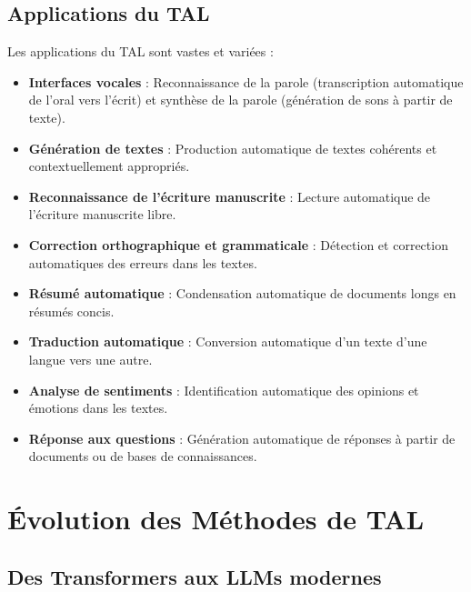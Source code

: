 \subsection{Applications du TAL}

Les applications du TAL sont vastes et variées :

\begin{itemize}
    \item \textbf{Interfaces vocales} : Reconnaissance de la parole (transcription automatique de l'oral vers l'écrit) et synthèse de la parole (génération de sons à partir de texte).
    
    \item \textbf{Génération de textes} : Production automatique de textes cohérents et contextuellement appropriés.
    
    \item \textbf{Reconnaissance de l'écriture manuscrite} : Lecture automatique de l'écriture manuscrite libre.
    
    \item \textbf{Correction orthographique et grammaticale} : Détection et correction automatiques des erreurs dans les textes.
    
    \item \textbf{Résumé automatique} : Condensation automatique de documents longs en résumés concis.
    
    \item \textbf{Traduction automatique} : Conversion automatique d'un texte d'une langue vers une autre.
    
    \item \textbf{Analyse de sentiments} : Identification automatique des opinions et émotions dans les textes.
    
    \item \textbf{Réponse aux questions} : Génération automatique de réponses à partir de documents ou de bases de connaissances.
\end{itemize}

\section{Évolution des Méthodes de TAL}

\subsection{Des Transformers aux LLMs modernes}

